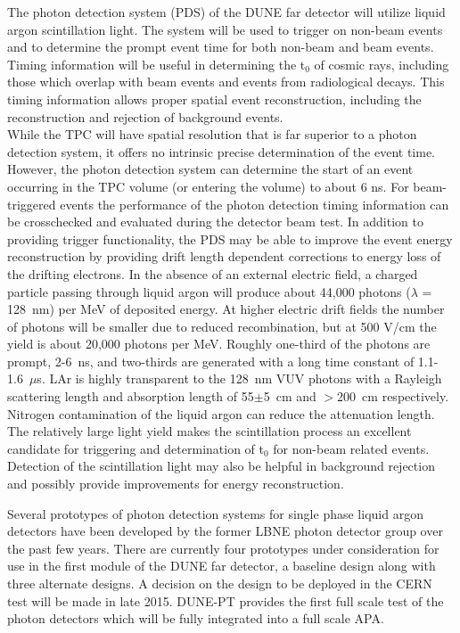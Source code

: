 



The photon detection system (PDS) of the DUNE far detector will utilize liquid argon scintillation light.  The system will be used to trigger on non-beam events and to determine the prompt event time for both non-beam and beam events. 
Timing information will be useful in determining the t$_0$ of cosmic rays, including those which 
overlap with beam events and events from radiological decays. This timing information allows proper spatial event reconstruction, including 
the reconstruction and rejection of background events.\\
%
While the TPC will have spatial resolution that is far superior to a photon detection system, it offers no intrinsic precise determination of the event time. However, the photon detection system can determine the start of an event occurring in the TPC volume (or entering the volume) to about 6 ns. For beam-triggered events the performance of the photon detection timing information can be crosschecked and evaluated during the detector beam test. In addition to providing trigger functionality, the PDS may be able to improve the event energy reconstruction by providing drift length dependent corrections to energy loss of the drifting electrons.
In the absence of an external electric field, a charged particle passing through liquid argon will produce about 44,000 photons ($\lambda$ = 128~nm) per MeV of deposited energy. 
At higher electric drift fields the number of photons will be smaller due to reduced recombination, but at 500 V/cm the yield is about 20,000 photons per MeV. Roughly one-third of the photons are prompt, 2-6~ns, and two-thirds are generated with a long time constant of 1.1-1.6~$\mu$s. LAr is highly transparent to the 128~nm VUV photons with a Rayleigh scattering length and absorption length of 55$\pm$5~cm \cite{rayleigh} and $>$200~cm \cite{absorption} respectively. Nitrogen contamination of the liquid argon can reduce the attenuation length. 
The relatively large light yield makes the scintillation process an excellent candidate for triggering and  determination of t$_0$ for non-beam related events. Detection of the scintillation light may also be helpful in background rejection and possibly
provide improvements for energy reconstruction.

Several prototypes of photon detection systems for single phase liquid argon detectors have been developed by the former LBNE photon detector group over the past few years. There are currently four prototypes under consideration for use in the first module of the DUNE far detector, a baseline design along with three alternate designs. A decision on the design to be deployed in the CERN test will be made in late 2015. 
DUNE-PT provides the first full scale test of the photon detectors which will be fully integrated into a 
full scale APA. 

